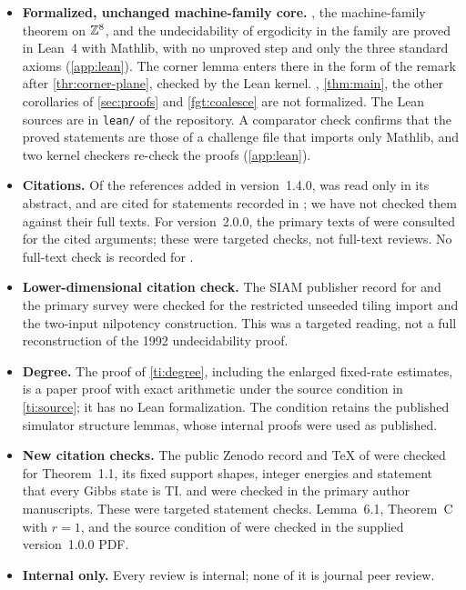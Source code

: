 \begin{itemize}
\item \textbf{Formalized, unchanged machine-family core.} , the machine-family theorem on $\mathbb{Z}^8$, and the undecidability of ergodicity in the family are proved in Lean~4 with Mathlib, with no unproved step and only the three standard axioms (\cref{app:lean}). The corner lemma enters there in the form of the remark after \cref{thr:corner-plane}, checked by the Lean kernel. , \cref{thm:main}, the other corollaries of \cref{sec:proofs} and \cref{fgt:coalesce} are not formalized. The Lean sources are in \texttt{lean/} of the repository. A comparator check confirms that the proved statements are those of a challenge file that imports only Mathlib, and two kernel checkers re-check the proofs (\cref{app:lean}).
\item \textbf{Citations.} Of the references added in version~1.4.0, \cite{Sla81} was read only in its abstract, and \cite{Dob68,DS85,LMS90,vdBS99} are cited for statements recorded in \cite{DM26}; we have not checked them against their full texts. For version~2.0.0, the primary texts of \cite{Gacs21,BMM13,MST19,Robinson71,SST26} were consulted for the cited arguments; these were targeted checks, not full-text reviews. No full-text check is recorded for \cite{Choquet,Kechris,Radon21,Helly23,Hoeffding63,PW96,BermanSimon88}.
\item \textbf{Lower-dimensional citation check.} The SIAM publisher record for \cite{Kari92} and the primary survey \cite[Section~2.8, Theorem~5; discussion after Theorem~15, p.~24]{Kari05} were checked for the restricted unseeded tiling import and the two-input nilpotency construction. This was a targeted reading, not a full reconstruction of the 1992 undecidability proof.
\item \textbf{Degree.} The proof of \cref{ti:degree}, including the enlarged fixed-rate estimates, is a paper proof with exact arithmetic under the source condition in \cref{ti:source}; it has no Lean formalization. The condition retains the published simulator structure lemmas, whose internal proofs were used as published.
\item \textbf{New citation checks.} The public Zenodo record and TeX of \cite{Sandhu26} were checked for Theorem~1.1, its fixed support shapes, integer energies and statement that every Gibbs state is TI. \cite[Propositions~14--15]{GST25} and \cite[Proposition~48]{Torma15} were checked in the primary author manuscripts. These were targeted statement checks. Lemma~6.1, Theorem~C with $r=1$, and the source condition of \cite{DMrice} were checked in the supplied version~1.0.0 PDF.
\item \textbf{Internal only.} Every review is internal; none of it is journal peer review.
\end{itemize}




